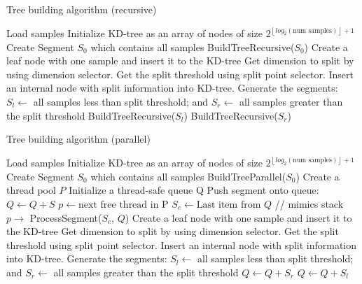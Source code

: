 \documentclass[11pt]{amsart}
\begin{document}
\begin{algorithm}
\caption{Tree building algorithm (recursive)}
\label{tree_building_recursive}
\begin{algorithmic}[1]
\State Load samples
\State Initialize KD-tree as an array of nodes of size $2^{\left \lfloor{log_{2}(\text{num samples})}\right \rfloor + 1 }$ 
\State Create Segment $S_0$ which contains all samples
\State 
\State BuildTreeRecursive($S_0$)
\State 
{}
\State Create a leaf node with one sample and insert it to the KD-tree
\Else
\State Get dimension to split by using dimension selector.
\State Get the split threshold using split point selector.
\State Insert an internal node with split information into KD-tree.
\State
\State Generate the segments:
\State $S_l \gets $ all samples less than split threshold; and
\State $S_r \gets $  all samples greater than the split threshold
\State
\State BuildTreeRecursive($S_l$)
\State BuildTreeRecursive($S_r$)
\EndIf
\EndProcedure
\end{algorithmic}
\end{algorithm}

\begin{algorithm}
\caption{Tree building algorithm (parallel)}
\label{tree_building_parallel}
\begin{algorithmic}[1]
\State Load samples
\State Initialize KD-tree as an array of nodes of size $2^{\left \lfloor{log_{2}(\text{num samples})}\right \rfloor + 1 }$ 
\State Create Segment $S_0$ which contains all samples
\State 
\State BuildTreeParallel($S_0$)
\State
{}
\State Create a thread pool $P$
\State Initialize a thread-safe queue Q
\State Push segment onto queue: $Q \gets Q + S$
\State $p \gets \text{next free thread in P}$
\State $S_c \gets \text{Last item from } Q$ \hspace{0.5in}// mimics stack
\State $p \rightarrow$  ProcessSegment($S_c$, $Q$)
\EndWhile
\EndProcedure
\State
{}
\State Create a leaf node with one sample and insert it to the KD-tree
\Else
\State Get dimension to split by using dimension selector.
\State Get the split threshold using split point selector.
\State Insert an internal node with split information into KD-tree.
\State
\State Generate the segments:
\State $S_l \gets $ all samples less than split threshold; and
\State $S_r \gets $  all samples greater than the split threshold
\State
\State $Q \gets Q + S_r$
\State $Q \gets Q + S_l$
\EndIf
\EndProcedure
\State 
\end{algorithmic}
\end{algorithm}
\end{document}
